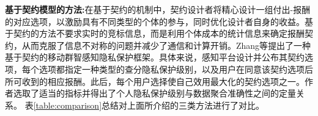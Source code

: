 \textbf{基于契约模型的方法:}在基于契约的机制中，契约设计者将精心设计一组付出-报酬的对应选项，以激励具有不同类型的个体的参与，同时优化设计者自身的收益。基于契约的方法不要求实时的竞标信息，而是利用个体成本的统计信息来确定报酬契约，从而克服了信息不对称的问题并减少了通信和计算开销。Zhang等\cite{Kun1}提出了一种基于契约的移动群智感知隐私保护框架。具体来说，感知平台设计并公布其契约选项，每个选项都指定一种类型的查分隐私保护级别，以及用户在同意该契约选项后所可收到的相应报酬。此后，每个用户选择使自己效用最大化的契约选项之一。作者选取了适当的指标并得出了个人隐私保护级别与数据聚合准确性之间的定量关系。
表\ref{table:comparison}总结对上面所介绍的三类方法进行了对比。

